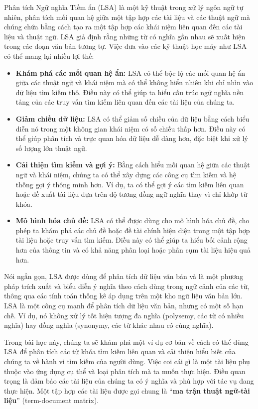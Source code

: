 Phân tích Ngữ nghĩa Tiềm ẩn (LSA) là một kỹ thuật trong xử lý ngôn ngữ tự nhiên, phân tích mối quan hệ giữa một tập hợp các tài liệu và các thuật ngữ mà chúng chứa bằng cách tạo ra một tập hợp các khái niệm liên quan đến các tài liệu và thuật ngữ. LSA giả định rằng những từ có nghĩa gần nhau sẽ xuất hiện trong các đoạn văn bản tương tự. Việc đưa vào các kỹ thuật học máy như LSA có thể mang lại nhiều lợi thế:

\begin{itemize}
  \item \textbf{Khám phá các mối quan hệ ẩn:} LSA có thể bộc lộ các mối quan hệ ẩn giữa các thuật ngữ và khái niệm mà có thể không hiển nhiên khi chỉ nhìn vào dữ liệu tìm kiếm thô. Điều này có thể giúp ta hiểu cấu trúc ngữ nghĩa nền tảng của các truy vấn tìm kiếm liên quan đến các tài liệu của chúng ta.

  \item \textbf{Giảm chiều dữ liệu:} LSA có thể giảm số chiều của dữ liệu bằng cách biểu diễn nó trong một không gian khái niệm có số chiều thấp hơn. Điều này có thể giúp phân tích và trực quan hóa dữ liệu dễ dàng hơn, đặc biệt khi xử lý số lượng lớn thuật ngữ.

  \item \textbf{Cải thiện tìm kiếm và gợi ý:} Bằng cách hiểu mối quan hệ giữa các thuật ngữ và khái niệm, chúng ta có thể xây dựng các công cụ tìm kiếm và hệ thống gợi ý thông minh hơn. Ví dụ, ta có thể gợi ý các tìm kiếm liên quan hoặc đề xuất tài liệu dựa trên độ tương đồng ngữ nghĩa thay vì chỉ khớp từ khóa.

  \item \textbf{Mô hình hóa chủ đề:} LSA có thể được dùng cho mô hình hóa chủ đề, cho phép ta khám phá các chủ đề hoặc đề tài chính hiện diện trong một tập hợp tài liệu hoặc truy vấn tìm kiếm. Điều này có thể giúp ta hiểu bối cảnh rộng hơn của thông tin và có khả năng phân loại hoặc phân cụm tài liệu hiệu quả hơn.
\end{itemize}

Nói ngắn gọn, LSA được dùng để phân tích dữ liệu văn bản và là một phương pháp trích xuất và biểu diễn ý nghĩa theo cách dùng trong ngữ cảnh của các từ, thông qua các tính toán thống kê áp dụng trên một kho ngữ liệu văn bản lớn. LSA là một công cụ mạnh để phân tích dữ liệu văn bản, nhưng có một số hạn chế. Ví dụ, nó không xử lý tốt hiện tượng đa nghĩa (polysemy, các từ có nhiều nghĩa) hay đồng nghĩa (synonymy, các từ khác nhau có cùng nghĩa).

Trong bài học này, chúng ta sẽ khám phá một ví dụ cơ bản về cách có thể dùng LSA để phân tích các từ khóa tìm kiếm liên quan và cải thiện hiểu biết của chúng ta về hành vi tìm kiếm của người dùng. Việc coi cái gì là một tài liệu phụ thuộc vào ứng dụng cụ thể và loại phân tích mà ta muốn thực hiện. Điều quan trọng là đảm bảo các tài liệu của chúng ta có ý nghĩa và phù hợp với tác vụ đang thực hiện. Một tập hợp các tài liệu được gọi chung là ``\textbf{ma trận thuật ngữ-tài liệu}'' (term-document matrix).

